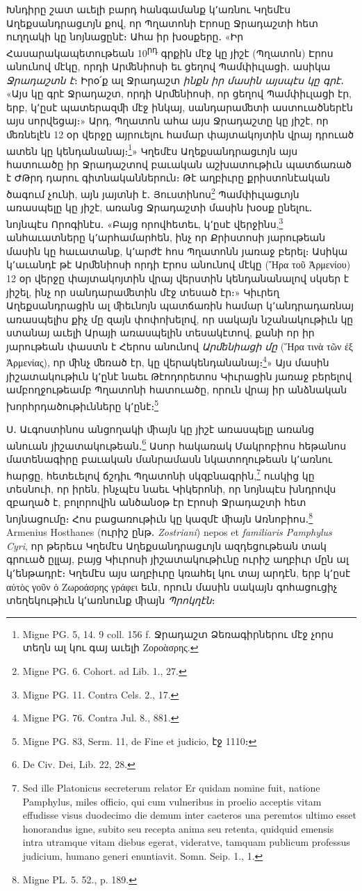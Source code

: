 \documentclass{article}
\begin{document}
{Խնդիրը շատ աւելի բարդ հանգամանք կ՚առնու Կղեմէս Աղեքսանդրացւոյն քով, որ Պղատոնի Էրոսը Ջրադաշտի հետ ուղղակի կը նոյնացընէ։ Ահա իր խօսքերը․ «Իր Հասարակապետութեան 10\textsuperscript{րդ} գրքին մէջ կը յիշէ (Պղատոն) Էրոս անունով մէկը, որդի Արﬔնիոսի եւ ցեղով Պամփիւլացի․ ասիկա \emph{Ջրադաշտն է}։ Իրօ՛ք ալ Ջրադաշտ \emph{ինքն իր մասին այսպէս կը գրէ}․ «Այս կը գրէ Ջրադաշտ, որդի Արﬔնիոսի, որ ցեղով Պամփիւլացի էր, երբ, կ՚ըսէ պատերազﬕ մէջ ինկայ, սանդարաﬔտի աստուածներէն այս սորվեցայ։» Արդ, Պղատոն ահա այս Ջրադաշտը կը յիշէ, որ ﬔռնելէն 12 օր վերջը այրուելու համար փայտակոյտին վրայ դրուած ատեն կը կենդանանայ։\footnote{Migne PG. 5, 14. 9 coll. 156 f. Ջրադաշտ Ձեռագիրներու մէջ չորս տեղն ալ կու գայ աւելի Ζοροὰσρης.}» Կղեմէս Աղեքսանդրացւոյն այս հատուածը իր Ջրադաշտով բաւական աշխատութիւն պատճառած է ԺԹրդ դարու գիտնականներուն։ Թէ աղբիւրը քրիստոնէական ծագում չունի, այն յայտնի է․ Յուստինոս\footnote{Migne PG. 6. Cohort. ad Lib. 1., 27.} Պամփիւլացւոյն առասպելը կը յիշէ, առանց Ջրադաշտի մասին խօսք ընելու․ նոյնպէս Որոգինէս․ «Բայց որովհետեւ, կ՚ըսէ վերջինս,\footnote{Migne PG. 11. Contra Cels. 2., 17.} անհաւատները կ՚արհամարհեն, ինչ որ Քրիստոսի յարութեան մասին կը հաւատանք, կ՚արժէ հոս Պղատոնն յառաջ բերել։ Ասիկա կ՚աւանդէ թէ Արﬔնիոսի որդի Էրոս անունով մէկը (Ἤρα τοῦ Ἀρμενίου) 12 օր վերջը փայտակոյտին վրայ վերստին կենդանանալով սկսեր է յիշել, ինչ որ սանդարաﬔտին մէջ տեսած էր։» Կիւրեղ Աղեքսանդրացին ալ ﬕեւնոյն պատճառին համար կ՚անդրադառնայ առասպելիս քիչ մը զայն փոփոխելով, որ սակայն նշանակութիւն կը ստանայ աւելի Արայի առասպելին տեսակէտով, քանի որ իր յարութեան փաստն է Հերոս անունով \emph{Արﬔնիացի մը} (Ἥρα τινὰ τῶν ἐξ Ἀρμενίας), որ ﬕնչ ﬔռած էր, կը վերակենդանանայ։\footnote{Migne PG. 76. Contra Jul. 8., 881.}» Այս մասին յիշատակութիւն կ՚ընէ նաեւ Թէոդորետոս Կիւրացին յառաջ բերելով ամբողջութեամբ Պղատոնի հատուածը, որուն վրայ իր անձնական խորհրդածութիւնները կ՚ընէ։\footnote{Migne PG. 83, Serm. 11, de Fine et judicio, էջ 1110։}

Ս․ Աւգոստինոս անցողակի ﬕայն կը յիշէ առասպելը առանց անուան յիշատակութեան․\footnote{De Civ. Dei, Lib. 22, 28.} Ասոր հակառակ Մակրոբիոս հեթանոս մատենագիրը բաւական մանրամասն նկատողութեան կ՚առնու հարցը, հետեւելով ճշդիւ Պղատոնի սկզբնագրին,\footnote{Sed ille Platonicus secreterum relator Er quidam nomine fuit, natione Pamphylus, miles officio, qui cum vulneribus in proelio acceptis vitam effudisse visus duodecimo die demum inter caeteros una peremtos ultimo esset honorandus igne, subito seu recepta anima seu retenta, quidquid emensis intra utramque vitam diebus egerat, videratve, tamquam publicum professus judicium, humano generi enuntiavit. Somn. Seip. 1., 1.} ուսկից կը տեսնուի, որ իրեն, ինչպէս նաեւ Կիկերոնի, որ նոյնպէս խնդրովս զբաղած է, բոլորովին անծանօթ էր Էրոսի Ջրադաշտի հետ նոյնացումը։ Հոս բացառութիւն կը կազմէ ﬕայն Առնոբիոս․\footnote{Migne PL. 5. 52., p. 189.} Armenius Hosthanes (ուրիշ ընթ․ \emph{Zostriani}) nepos et \emph{familiaris Pamphylus Cyri}, որ թերեւս Կղեմէս Աղեքսանդրացւոյն ազդեցութեան տակ գրուած ըլլայ, բայց Կիւրոսի յիշատակութիւնը ուրիշ աղբիւր մըն ալ կ՚ենթադրէ։ Կղեմէս այս աղբիւրը կռահել կու տայ արդէն, երբ կ՚ըսէ αὐτὸς γοῦν ὁ Ζωροάσρης γράφει եւն, որուն մասին սակայն գոհացուցիչ տեղեկութիւն կ՚առնունք ﬕայն \emph{Պրոկղէն}։

}
\end{document}
